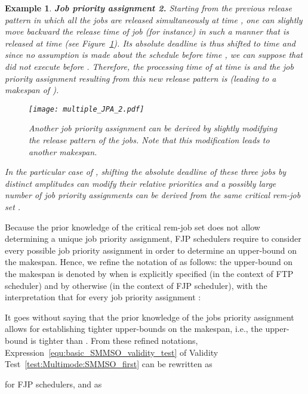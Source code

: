 \documentclass{article}
\newtheorem{validity test}{Validity Test}
\newtheorem{Example}{Example}
\begin{document}
\begin{Example}
\noindent \textbf{Job priority assignment 2.} Starting from the previous release pattern in which all the jobs are released simultaneously at time , one can slightly move backward the release time of job  (for instance) in such a manner that  is released at time  (see Figure~\ref{fig:Multimode:multiple_JPA_2}). Its absolute deadline  is thus shifted to time  and since no assumption is made about the schedule before time , we can suppose that  did not execute before . Therefore, the processing time of  at time  is  and the job priority assignment resulting from this new release pattern is  (leading to a makespan of ). 

\begin{figure}[h]
\begin{center}
\texttt{[image: multiple\_JPA\_2.pdf]}
\caption{Another job priority assignment can be derived by slightly modifying the release pattern of the jobs. Note that this modification leads to another makespan.}
\label{fig:Multimode:multiple_JPA_2}
\end{center}
\end{figure}

\noindent In the particular case of , shifting the absolute deadline of these three jobs by distinct amplitudes can modify their relative priorities and a possibly large number of job priority assignments can be derived from the same critical rem-job set .
\end{Example}

Because the prior knowledge of the critical rem-job set does not allow determining a unique job priority assignment, FJP schedulers require to consider every possible job priority assignment in order to determine an upper-bound on the makespan. Hence, we refine the notation of  as follows: the upper-bound on the makespan is denoted by  when  is explicitly specified (in the context of FTP scheduler) and by  otherwise (in the context of FJP scheduler), with the interpretation that for every job priority assignment : 
\label{null:Multimode:maxidle_instant_no_JPA}


It goes without saying that the prior knowledge of the jobs priority assignment allows for establishing tighter upper-bounds on the makespan, i.e., the upper-bound  is tighter than . From these refined notations, Expression~\ref{equ:basic_SMMSO_validity_test} of Validity Test~\ref{test:Multimode:SMMSO_first} can be rewritten as
 
for FJP schedulers, and as 
 
\end{document}
